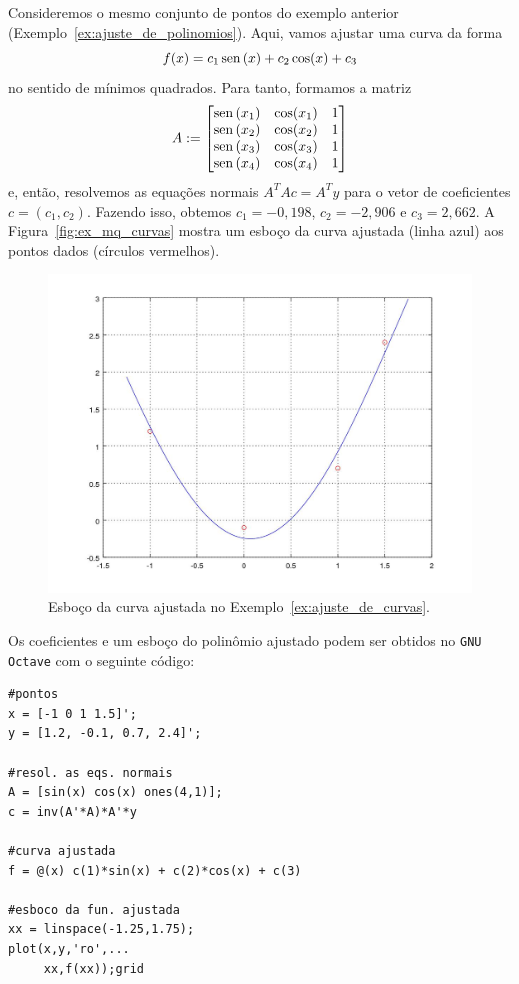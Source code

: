 \begin{ex}\label{ex:ajuste_de_curvas}
  Consideremos o mesmo conjunto de pontos do exemplo anterior (Exemplo~\ref{ex:ajuste_de_polinomios}). Aqui, vamos ajustar uma curva da forma
  \begin{equation}
    f(x) = c_1\operatorname{sen}\,(x) + c_2\cos(x) + c_3
  \end{equation}
no sentido de mínimos quadrados. Para tanto, formamos a matriz
\begin{equation}
  A :=
  \begin{bmatrix}
    \operatorname{sen}\,(x_1) & \cos(x_1) & 1 \\
    \operatorname{sen}\,(x_2) & \cos(x_2) & 1 \\
    \operatorname{sen}\,(x_3) & \cos(x_3) & 1 \\
    \operatorname{sen}\,(x_4) & \cos(x_4) & 1
  \end{bmatrix}
\end{equation}
  e, então, resolvemos as equações normais $A^TAc = A^Ty$ para o vetor de coeficientes $c=(c_1, c_2)$. Fazendo isso, obtemos $c_1=-0,198$, $c_2=-2,906$ e $c_3=2,662$. A Figura~\ref{fig:ex_mq_curvas} mostra um esboço da curva ajustada (linha azul) aos pontos dados (círculos vermelhos).

  \begin{figure}[h]
    \centering
    \includegraphics[width=\textwidth]{cap_ajuste/dados/ex_mq_curvas/ex_mq_curvas}
    \caption{Esboço da curva ajustada no Exemplo~\ref{ex:ajuste_de_curvas}.}
    \label{fig:ex_mq_poli}
  \end{figure}

\ifisoctave
Os coeficientes e um esboço do polinômio ajustado podem ser obtidos no \verb+GNU Octave+ com o seguinte código:
\begin{verbatim}
#pontos
x = [-1 0 1 1.5]';
y = [1.2, -0.1, 0.7, 2.4]';

#resol. as eqs. normais
A = [sin(x) cos(x) ones(4,1)];
c = inv(A'*A)*A'*y

#curva ajustada
f = @(x) c(1)*sin(x) + c(2)*cos(x) + c(3)

#esboco da fun. ajustada
xx = linspace(-1.25,1.75);
plot(x,y,'ro',...
     xx,f(xx));grid
\end{verbatim}
\fi

\end{ex}

